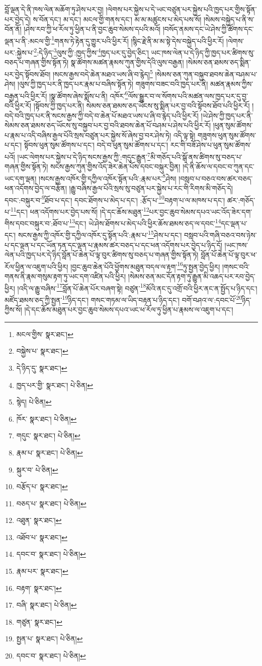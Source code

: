 བློ་ལྡན་དེ་ནི་ཁས་ལེན་མཆོག་ཏུ་ཤེས་པར་བྱ། །ལེགས་པར་སྐྱེས་པ་དེ་ཡང་བཙུན་པར་སྐྱེས་པའི་ཁྱད་པར་གྱིས་སྟོན་པར་བྱེད་དེ། ས་བོན་དང་། མ་དང་། མངལ་གྱི་གནས་དང་། མ་མ་མཚུངས་པ་མེད་པས་སོ། །སེམས་བསྐྱེད་པ་ནི་ས་བོན་ནོ། །ཤེས་རབ་ཀྱི་ཕ་རོལ་ཏུ་ཕྱིན་པ་ནི་བྱང་ཆུབ་སེམས་དཔའི་མའོ། །བསོད་ནམས་དང་ཡེ་ཤེས་ཀྱི་ཚོགས་དང་ལྡན་པ་ནི་:མངལ་གྱི་\footnote{མངལ་གྱིས་  སྣར་ཐང་། }གནས་ཏེ་རྟེན་དུ་གྱུར་པའི་ཕྱིར་རོ། །སྙིང་རྗེ་ནི་མ་མ་སྟེ་དེས་བསྐྱེད་པའི་ཕྱིར་རོ། །ལེགས་པར་:སྐྱེས་པ་\footnote{བསྐྱེས་པ་  སྣར་ཐང་། }:དེ་ཉིད་\footnote{དེ་ཉིད་དུ་  སྣར་ཐང་། }ལུས་ཀྱི་:ཁྱད་ཀྱིས་\footnote{ཁྱད་པར་གྱི་  སྣར་ཐང་།  པེ་ཅིན། }ཁྱད་པར་དུ་བྱེད་ཅིང་། ཡང་ཁས་ལེན་པ་དེ་ཉིད་ཀྱི་ཁྱད་པར་ཚིགས་སུ་བཅད་པ་གཞན་གྱིས་སྟོན་ཏེ། སྣ་ཚོགས་མཚན་རྣམས་ཀུན་གྱིས་དེའི་ལུས་བརྒྱན། །སེམས་ཅན་ཐམས་ཅད་སྨིན་པར་བྱེད་སྟོབས་ཐོབ། །སངས་རྒྱས་བདེ་ཆེན་མཐའ་ཡས་ཞི་བ་རྙེད།\footnote{སྙེད།  པེ་ཅིན། } །སེམས་ཅན་ཀུན་བསྐྱབ་ཐབས་ཆེན་བཤམ་པ་ཤེས། །ལུས་ཀྱི་ཁྱད་པར་ནི་ཁྱད་པར་རྣམ་པ་བཞིས་སྟོན་ཏེ། གཟུགས་བཟང་བའི་ཁྱད་པར་ནི། མཚན་རྣམས་ཀྱིས་བརྒྱན་པའི་ཕྱིར་རོ། །སྣ་ཚོགས་ཞེས་སྨོས་པ་ནི། འཁོར་\footnote{ཁོར་  སྣར་ཐང་།  པེ་ཅིན། }ལོས་སྒྱུར་བ་ལ་སོགས་པའི་མཚན་ལས་ཁྱད་པར་དུ་བྱ་བའི་ཕྱིར་རོ། །སྟོབས་ཀྱི་ཁྱད་པར་ནི། སེམས་ཅན་ཐམས་ཅད་ཡོངས་སུ་སྨིན་པར་བྱ་བའི་སྟོབས་ཐོབ་པའི་ཕྱིར་རོ། །བདེ་བའི་ཁྱད་པར་ནི་སངས་རྒྱས་ཀྱི་བདེ་བ་ཆེན་པོ་མཐའ་ཡས་པ་ཞི་བ་རྙེད་པའི་ཕྱིར་རོ། །ཡེ་ཤེས་ཀྱི་ཁྱད་པར་ནི་སེམས་ཅན་ཐམས་ཅད་ཡོངས་སུ་བསྐྱབ་པར་བྱ་བའི་ཐབས་ཆེན་པོ་བཤམ་པ་ཤེས་པའི་ཕྱིར་རོ། །ཕུན་སུམ་ཚོགས་པ་རྣམ་པ་འདི་བཞིས་རྒྱལ་པོའི་སྲས་བཙུན་པར་སྐྱེས་སོ་ཞེས་བྱ་བར་ཤེས་ཏེ། འདི་ལྟ་སྟེ། གཟུགས་ཕུན་སུམ་ཚོགས་པ་དང་། སྟོབས་ཕུན་སུམ་ཚོགས་པ་དང་། བདེ་བ་ཕུན་སུམ་ཚོགས་པ་དང་། རང་གི་བཟོ་ཤེས་པ་ཕུན་སུམ་ཚོགས་པའོ། །ཡང་ལེགས་པར་སྐྱེས་པ་དེ་ཉིད་སངས་རྒྱས་ཀྱི་:གདུང་རྒྱུན་\footnote{གདུང་  སྣར་ཐང་།  པེ་ཅིན། }མི་གཅོད་པའི་སྒོ་ནས་ཚིགས་སུ་བཅད་པ་གཞན་གྱིས་སྟོན་ཏེ། སངས་རྒྱས་ཀུན་གྱིས་འོད་ཟེར་ཆེན་པོས་དབང་བསྐུར་བྱིན། །དེ་ནི་ཆོས་ལ་དབང་བ་ཀུན་དང་ཡང་དག་ལྡན། །སངས་རྒྱས་འཁོར་གྱི་དཀྱིལ་འཁོར་སྟོན་པའི་:རྣམ་པར་\footnote{རྣམ་པ་  སྣར་ཐང་།  པེ་ཅིན། }ཤེས། །བསླབ་པ་བཅའ་བས་ཚར་བཅད་ཕན་འདོགས་བྱེད་ལ་བརྩོན། །རྒྱུ་བཞིས་རྒྱལ་པོའི་སྲས་སུ་བཙུན་པར་སྐྱེས་པ་རང་གི་རིགས་མི་གཅོད་དེ། དབང་:བསྐུར་བ་\footnote{སྐུར་བ་  པེ་ཅིན། }ཐོབ་པ་དང་། དབང་ཐོགས་པ་མེད་པ་དང་། :རྩོད་པ་\footnote{བརྩོད་པ་  སྣར་ཐང་། }བརྟག་པ་ལ་མཁས་པ་དང་། ཚར་:གཅོད་པ་\footnote{བཅད་པ་  སྣར་ཐང་།  པེ་ཅིན། }དང་། ཕན་འདོགས་པར་བྱེད་པས་སོ། །དེ་དང་ཆོས་མཐུན་\footnote{འཐུན་  སྣར་ཐང་། }པར་བྱང་ཆུབ་སེམས་དཔའ་ཡང་འོད་ཟེར་དག་གིས་དབང་བསྐུར་བ་:ཐོབ་པ་\footnote{འཐོབ་པ་  སྣར་ཐང་། }དང་། ཡེ་ཤེས་ཐོགས་པ་མེད་པའི་ཕྱིར་ཆོས་ཐམས་ཅད་ལ་དབང་\footnote{དབང་བ་  སྣར་ཐང་།  པེ་ཅིན། }དང་ལྡན་པ་དང་། སངས་རྒྱས་ཀྱི་འཁོར་གྱི་དཀྱིལ་འཁོར་དུ་སྟོན་པའི་:རྣམ་པ་\footnote{རྣམ་པར་  སྣར་ཐང་། }ཤེས་པ་དང་། བསླབ་པའི་གཞི་བཅའ་བས་ཉེས་པ་དང་ལྡན་པ་དང་ཡོན་ཏན་དང་ལྡན་པ་རྣམས་ཚར་བཅད་པ་དང་ཕན་འདོགས་པར་བྱེད་པ་ཉིད་དོ། །ཡང་ཁས་ལེན་པའི་ཁྱད་པར་དེ་ཉིད་བློན་པོ་ཆེན་པོ་ལྟ་བུར་ཚིགས་སུ་བཅད་པ་གཞན་གྱིས་སྟོན་ཏེ། བློན་པོ་ཆེན་པོ་ལྟ་བུར་ཕ་རོལ་ཕྱིན་ལ་འཇུག་པའི་ཕྱིར། །བྱང་ཆུབ་ཆེན་པོའི་ཕྱོགས་མཐུན་བདལ་ལ་རྟག་\footnote{བརྟག་  སྣར་ཐང་། }ཏུ་སྤྱན་བྱེད་ཕྱིར། །གསང་བའི་གནས་ནི་རྣམ་གསུམ་རྟག་ཏུ་ཡང་དག་འཛིན་པའི་ཕྱིར། །སེམས་ཅན་མང་དོན་རྟག་ཏུ་རྒྱུན་མི་འཆད་པར་རབ་བྱེད་ཕྱིར། །འདི་ལ་རྒྱུ་བཞིས་\footnote{བཞི་  སྣར་ཐང་།  པེ་ཅིན། }བློན་པོ་ཆེན་པོར་བཞག་སྟེ། བཙུན་\footnote{གཙུན་  སྣར་ཐང་། }མོའི་ནང་དུ་འགྲོ་བའི་ཕྱིར་ནང་ན་སྤྱོད་པ་ཉིད་དང་། མཛོད་ཐམས་ཅད་ཀྱི་སྤྱན་\footnote{སྤྱན་པ་  སྣར་ཐང་།  པེ་ཅིན། }ཉིད་དང་། གསང་གཏམ་ལ་ཡིད་བརྟན་པ་ཉིད་དང་། བགོ་བཤའ་ལ་:དབང་པོ་\footnote{དབང་བ་  སྣར་ཐང་།  པེ་ཅིན། }ཉིད་ཀྱིས་སོ། །དེ་དང་ཆོས་མཐུན་པར་བྱང་ཆུབ་སེམས་དཔའ་ཡང་ཕ་རོལ་ཏུ་ཕྱིན་པ་རྣམས་ལ་འཇུག་པ་དང་། 
